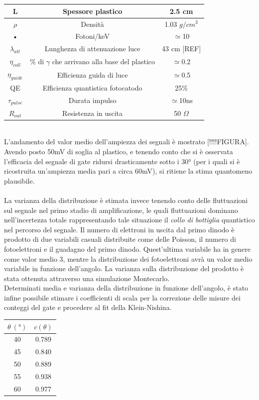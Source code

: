\documentclass[8pt]{extarticle}
\begin{document}
\\
\\
\begin{tabular}{|c|c|c|}
\hline 
L & Spessore plastico & 2.5 cm \\ 
\hline 
$\rho$ & Densità & 1.03 $g/cm^3$ \\ 
\hline 
• & Fotoni/keV & $\simeq$10 \\ 
\hline 
$\lambda_{att}$ & Lunghezza di attenuazione luce & 43 cm [REF] \\ 
\hline 
$\eta_{coll}$ & \% di $\gamma$ che arrivano alla base del plastico & $\simeq$0.2 \\ 
\hline 
$\eta_{guide}$ & Efficienza guida di luce & $\simeq$0.5 \\ 
\hline 
QE & Efficienza quantistica fotocatodo & 25\% \\ 
\hline 
$\tau_{pulse}$ & Durata impulso & $\simeq$10ns \\ 
\hline 
$R_{out}$ & Resistenza in uscita & 50 $\Omega$ \\ 
\hline 
\end{tabular} 
\\
L'andamento del valor medio dell'ampiezza dei segnali è mostrato [!!!!FIGURA]. Avendo posto 50mV di soglia al plastico, e tenendo conto che si è osservata l'efficacia del segnale di gate ridursi drasticamente sotto i 30° (per i quali si è ricostruita un'ampiezza media pari a circa 60mV), si ritiene la stima quantomeno plausibile.\\
\\
La varianza della distribuzione è stimata invece tenendo conto delle fluttuazioni sul segnale nel primo stadio di amplificazione, le quali fluttuazioni dominano nell'incertezza totale rappresentando tale situazione il \textit{collo di bottiglia} quantistico nel percorso del segnale.
Il numero di elettroni in uscita dal primo dinodo è prodotto di due variabili casuali distribuite come delle Poisson, il numero di fotoelettroni e il guadagno del primo dinodo. Quest'ultima variabile ha in genere come valor medio 3, mentre la distribuzione dei fotoelettroni avrà un valor medio variabile in funzione dell'angolo. La varianza sulla distribuzione del prodotto è stata ottenuta attraverso una simulazione Montecarlo.
\\
Determinati media e varianza della distribuzione in funzione dell'angolo, è stato infine possibile stimare i coefficienti di scala per la correzione delle misure dei conteggi del gate e procedere al fit della Klein-Nishina.
\begin{tabular}{|c|c|}
\hline 
$\theta\ (°)$ & $c(\theta)$ \\ 
\hline 
40 & 0.789 \\ 
\hline 
45 & 0.840 \\ 
\hline 
50 & 0.889 \\ 
\hline 
55 & 0.938 \\ 
\hline 
60 & 0.977 \\ 
\hline 
\end{tabular}
\end{document}
